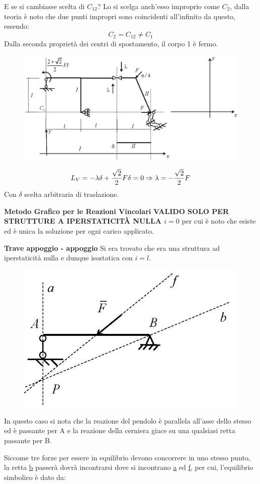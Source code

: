 \documentclass{article}
\begin{document}
\begin{adjustwidth}{2in}{}
E se si cambiasse scelta di $C_{12}$? Lo si scelga anch'esso improprio come $C_2$, dalla teoria è noto che due punti impropri sono coincidenti all'infinito da questo, essendo:
\[C_2 = C_{12} \ne C_1\]
Dalla seconda proprietà dei centri di spostamento, il corpo 1 è fermo. 

\begin{figure}[H]
	\centering
	\includegraphics[width=0.5\linewidth]{immagini/1.PARTE4_Pagina_23}
\end{figure}

\[L_V = -\lambda\delta + {\sqrt{2}\over2}F\delta = 0 \Rightarrow \lambda = -{\sqrt{2}\over2}F \]
Con $\delta$ scelta arbitraria di traslazione.\newline \newpage
 
 {\Large \textbf{Metodo Grafico per le Reazioni Vincolari}} \mbox{} \newline
  \textbf{{\small VALIDO SOLO PER STRUTTURE A IPERSTATICITÀ NULLA $i =0$}} per cui è noto che esiste ed è unica la soluzione per ogni carico applicato. \newline 

\textbf{Trave appoggio - appoggio } \newline
Si era trovato che era una struttura ad iperstaticità nulla e dunque isostatica con $i=l$. 
\begin{figure}[H]
	\centering
	\includegraphics[width=0.4\linewidth]{immagini/1.PARTE4_Pagina_24}
\end{figure}

In questo caso si nota che la reazione del pendolo è parallela all'asse dello stesso ed è passante per A e la reazione della cerniera giace su una qualsiasi retta passante per B. 

Siccome tre forze per essere in equilibrio devono concorrere in uno stesso punto, la retta \underline{b} passerà dovrà incontrarsi dove si incontrano \underline{a} ed \underline{f}, per cui, l'equilibrio simbolico è dato da: 


\end{adjustwidth}
\end{document}
